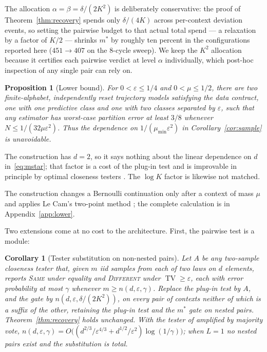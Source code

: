\documentclass{article}
\newtheorem{proposition}[theorem]{Proposition}
\newtheorem{corollary}[theorem]{Corollary}
\newcommand{\eps}{\varepsilon}
\DeclareMathOperator{\TV}{TV}
\begin{document}
The allocation $\alpha=\beta=\delta/(2K^2)$ is deliberately conservative:
the proof of Theorem~\ref{thm:recovery} spends only $\delta/(4K)$ across
per-context deviation events, so setting the pairwise budget to that
actual total spend --- a relaxation by a factor of $K/2$ --- shrinks $m^*$
by roughly ten percent in the
configurations reported here ($451\to407$ on the 8-cycle sweep).  We keep
the $K^2$ allocation because it certifies each pairwise verdict at level
$\alpha$ individually, which post-hoc inspection of any single pair can
rely on.

\begin{proposition}[Lower bound]                         \label{prop:lower}
For $0<\eps\le1/4$ and $0<\mu\le1/2$, there are two finite-alphabet,
independently reset trajectory models satisfying the data contract, one with
one predictive class and one with two classes separated by $\eps$, such that
any estimator has worst-case partition error at least $3/8$ whenever
$N\le1/(32\mu\eps^2)$.  Thus the dependence on
$1/(\mu_{\min}\eps^2)$ in Corollary~\ref{cor:sample} is unavoidable.
\end{proposition}

The construction has $d=2$, so it says nothing about the linear dependence
on $d$ in~\eqref{eq:mstar}; that factor is a cost of the plug-in test and
is improvable in principle by optimal closeness testers
\citep{chan2014optimal}.  The $\log K$ factor is likewise not matched.

The construction changes a Bernoulli continuation only after a context of
mass $\mu$ and applies Le Cam's two-point method
\citep[Theorem~2.2]{tsybakov2009nonparametric}; the complete calculation is in
Appendix~\ref{app:lower}.

Two extensions come at no cost to the architecture.  First, the pairwise
test is a module:

\begin{corollary}[Tester substitution on non-nested pairs]\label{cor:tester}
Let $A$ be any two-sample closeness tester that, given $m$ iid samples from
each of two laws on $d$ elements, reports \textnormal{\textsc{Same}} under
equality and \textnormal{\textsc{Different}} under $\TV\ge\eps$, each with
error probability at most $\gamma$ whenever $m\ge n(d,\eps,\gamma)$.
Replace the plug-in test by $A$, and the gate by
$n(d,\eps,\delta/(2K^2))$, on every pair of contexts neither of which is a
suffix of the other, retaining the plug-in test and the $m^*$ gate on
nested pairs.  Theorem~\ref{thm:recovery} holds unchanged.  With the tester
of \citet{chan2014optimal} amplified by majority vote,
$n(d,\eps,\gamma)=O\bigl((d^{2/3}/\eps^{4/3}+d^{1/2}/\eps^{2})
\log(1/\gamma)\bigr)$; when $L=1$ no nested pairs exist and the
substitution is total.
\end{corollary}
\end{document}
